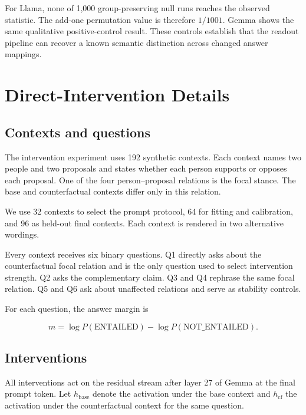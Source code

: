 \documentclass{article}
\begin{document}
For Llama, none of 1,000 group-preserving null runs reaches the observed
statistic. The add-one permutation value is therefore $1/1001$. Gemma shows
the same qualitative positive-control result. These controls establish that
the readout pipeline can recover a known semantic distinction across changed
answer mappings.



\section{Direct-Intervention Details}
\label{app:direct-intervention}

\subsection{Contexts and questions}

The intervention experiment uses 192 synthetic contexts. Each context names
two people and two proposals and states whether each person supports or
opposes each proposal. One of the four person--proposal relations is the
focal stance. The base and counterfactual contexts differ only in this
relation.

We use 32 contexts to select the prompt protocol, 64 for fitting and
calibration, and 96 as held-out final contexts. Each context is rendered in
two alternative wordings.

Every context receives six binary questions. Q1 directly asks about the
counterfactual focal relation and is the only question used to select
intervention strength. Q2 asks the complementary claim. Q3 and Q4 rephrase
the same focal relation. Q5 and Q6 ask about unaffected relations and serve
as stability controls.

For each question, the answer margin is

\[
m
=
\log P(\text{ENTAILED})
-
\log P(\text{NOT\_ENTAILED}).
\]

\subsection{Interventions}

All interventions act on the residual stream after layer 27 of Gemma at the
final prompt token. Let $h_{\mathrm{base}}$ denote the activation under the
base context and $h_{\mathrm{cf}}$ the activation under the counterfactual
context for the same question.
\end{document}
